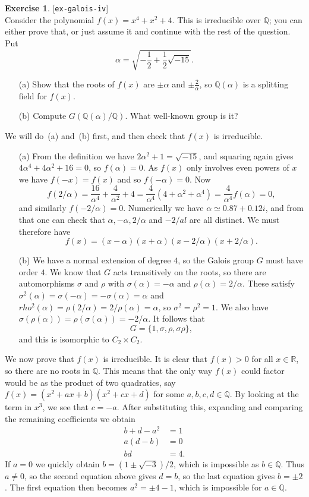 \documentclass{amsart}
\newcommand{\Q}         {{\mathbb{Q}}}
\newcommand{\R}         {{\mathbb{R}}}
\newcommand{\al}        {\alpha}
\newcommand{\sg}        {\sigma}
\newcommand{\tm}        {\times}
\renewcommand{\:}{\colon}
\newcommand{\lastexlabel}{}
\newcommand{\exlabel}[1]{
 \global\def\lastexlabel{#1}\label{#1}[\texttt{#1}]\ \\
}
\newcommand{\exlabel}[1]{
 \global\def\lastexlabel{#1}\label{#1}
}
\newenvironment{solution}{\SolutionInline}{\endSolutionInline}
\theoremstyle{definition}
\newtheorem{exercise}{Exercise}[section]
\renewenvironment{solution}{\SolutionAtEnd}{\endSolutionAtEnd}
\begin{document}
\begin{exercise}\exlabel{ex-galois-iv}
 Consider the polynomial $f(x)=x^4+x^2+4$.  This is irreducible over
 $\Q$; you can either prove that, or just assume it and continue with
 the rest of the question.  Put 
 \[ \al=\sqrt{-\frac{1}{2}+\frac{1}{2}\sqrt{-15}}. \]
 \begin{itemize}
  \item[(a)] Show that the roots of $f(x)$ are $\pm\al$ and
   $\pm\frac{2}{\al}$, so $\Q(\al)$ is a splitting field for $f(x)$. 
  \item[(b)] Compute $G(\Q(\al)/\Q)$. What well-known group is it?
 \end{itemize}
\end{exercise}
\begin{solution}
 We will do~(a) and~(b) first, and then check that $f(x)$ is
 irreducible. 
 \begin{itemize}
  \item[(a)] From the definition we have $2\al^2+1=\sqrt{-15}$, and
   squaring again gives $4\al^4+4\al^2+16=0$, so $f(\al)=0$.  As
   $f(x)$ only involves even powers of $x$ we have $f(-x)=f(x)$ and so
   $f(-\al)=0$.  Now 
   \[ f(2/\al) = \frac{16}{\al^4} + \frac{4}{\al^2} + 4 = 
       \frac{4}{\al^4}(4+\al^2+\al^4) = \frac{4}{\al^4}f(\al)= 0,
   \]
   and similarly $f(-2/\al)=0$.  Numerically we have
   $\al\simeq 0.87+0.12i$, and from that one can check that
   $\al,-\al,2/\al$ and $-2/al$ are all distinct.  We must therefore
   have 
   \[ f(x) = (x-\al)(x+\al)(x-2/\al)(x+2/\al). \]

  \item[(b)] We have a normal extension of degree $4$, so the Galois
   group $G$ must have order $4$.  We know that $G$ acts transitively
   on the roots, so there are automorphisms $\sg$ and $\rho$ with
   $\sg(\al)=-\al$ and $\rho(\al)=2/\al$.  These satisfy
   $\sg^2(\al)=\sg(-\al)=-\sg(\al)=\al$ and
   $rho^2(\al)=\rho(2/\al)=2/\rho(\al)=\al$, so $\sg^2=\rho^2=1$.  We
   also have $\sg(\rho(\al))=\rho(\sg(\al))=-2/\al$.  It follows that 
   \[ G = \{1,\sg,\rho,\sg\rho\}, \]
   and this is isomorphic to $C_2\tm C_2$.
 \end{itemize} 

 We now prove that $f(x)$ is irreducible.  It is clear that $f(x)>0$
 for all $x\in\R$, so there are no roots in $\Q$.  This means that the
 only way $f(x)$ could factor would be as the product of two
 quadratics, say $f(x)=(x^2+ax+b)(x^2+cx+d)$ for some $a,b,c,d\in\Q$.
 By looking at the term in $x^3$, we see that $c=-a$.  After
 substituting this, expanding and comparing the remaining coefficients
 we obtain
 \begin{align*}
  b+d-a^2 &= 1 \\
  a(d-b) &= 0 \\
  bd &= 4.
 \end{align*}
 If $a=0$ we quickly obtain $b=(1\pm\sqrt{-3})/2$, which is impossible
 as $b\in\Q$.  Thus $a\neq 0$, so the second equation above gives
 $d=b$, so the last equation gives $b=\pm 2$.  The first equation then
 becomes $a^2=\pm 4-1$, which is impossible for $a\in\Q$.
\end{solution}
\end{document}
